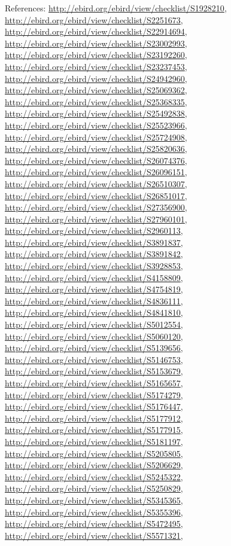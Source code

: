 \documentclass[9pt, article]{memoir}
\begin{document}
\begin{multicols}{2}
\vspace{6pt}References: 
\url{http://ebird.org/ebird/view/checklist/S1928210}, 
\url{http://ebird.org/ebird/view/checklist/S2251673}, 
\url{http://ebird.org/ebird/view/checklist/S22914694}, 
\url{http://ebird.org/ebird/view/checklist/S23002993}, 
\url{http://ebird.org/ebird/view/checklist/S23192260}, 
\url{http://ebird.org/ebird/view/checklist/S23237453}, 
\url{http://ebird.org/ebird/view/checklist/S24942960}, 
\url{http://ebird.org/ebird/view/checklist/S25069362}, 
\url{http://ebird.org/ebird/view/checklist/S25368335}, 
\url{http://ebird.org/ebird/view/checklist/S25492838}, 
\url{http://ebird.org/ebird/view/checklist/S25523966}, 
\url{http://ebird.org/ebird/view/checklist/S25724908}, 
\url{http://ebird.org/ebird/view/checklist/S25820636}, 
\url{http://ebird.org/ebird/view/checklist/S26074376}, 
\url{http://ebird.org/ebird/view/checklist/S26096151}, 
\url{http://ebird.org/ebird/view/checklist/S26510307}, 
\url{http://ebird.org/ebird/view/checklist/S26851017}, 
\url{http://ebird.org/ebird/view/checklist/S27356900}, 
\url{http://ebird.org/ebird/view/checklist/S27960101}, 
\url{http://ebird.org/ebird/view/checklist/S2960113}, 
\url{http://ebird.org/ebird/view/checklist/S3891837}, 
\url{http://ebird.org/ebird/view/checklist/S3891842}, 
\url{http://ebird.org/ebird/view/checklist/S3928853}, 
\url{http://ebird.org/ebird/view/checklist/S4158809}, 
\url{http://ebird.org/ebird/view/checklist/S4754819}, 
\url{http://ebird.org/ebird/view/checklist/S4836111}, 
\url{http://ebird.org/ebird/view/checklist/S4841810}, 
\url{http://ebird.org/ebird/view/checklist/S5012554}, 
\url{http://ebird.org/ebird/view/checklist/S5060120}, 
\url{http://ebird.org/ebird/view/checklist/S5139656}, 
\url{http://ebird.org/ebird/view/checklist/S5146753}, 
\url{http://ebird.org/ebird/view/checklist/S5153679}, 
\url{http://ebird.org/ebird/view/checklist/S5165657}, 
\url{http://ebird.org/ebird/view/checklist/S5174279}, 
\url{http://ebird.org/ebird/view/checklist/S5176447}, 
\url{http://ebird.org/ebird/view/checklist/S5177912}, 
\url{http://ebird.org/ebird/view/checklist/S5177915}, 
\url{http://ebird.org/ebird/view/checklist/S5181197}, 
\url{http://ebird.org/ebird/view/checklist/S5205805}, 
\url{http://ebird.org/ebird/view/checklist/S5206629}, 
\url{http://ebird.org/ebird/view/checklist/S5245322}, 
\url{http://ebird.org/ebird/view/checklist/S5250829}, 
\url{http://ebird.org/ebird/view/checklist/S5345365}, 
\url{http://ebird.org/ebird/view/checklist/S5355396}, 
\url{http://ebird.org/ebird/view/checklist/S5472495}, 
\url{http://ebird.org/ebird/view/checklist/S5571321}, 

\end{multicols}
\end{document}
